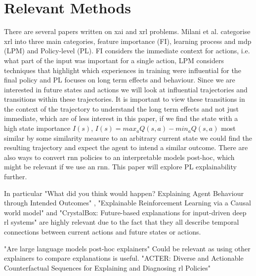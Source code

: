 \documentclass[UKenglish]{uiomasterthesis}
\begin{document}
\section{Relevant Methods}
There are several papers written on \ac{xai} and \ac{xrl} problems. Milani et al.\cite{milani2022survey} categorise \ac{xrl} into three main categories, feature importance (FI), learning process and \ac{mdp} (LPM) and Policy-level (PL). FI considers the immediate context for actions, i.e. what part of the input was important for a single action, LPM considers techniques that highlight which experiences in training were influential for the final policy and PL focuses on long term effects and behaviour. Since we are interested in future states and actions we will look at influential trajectories and transitions within these trajectories. It is important to view these transitions in the context of the trajectory to understand the long term effects and not just immediate, which are of less interest in this paper, if we find the state with a high state importance $I(s)$, $I(s) = max_aQ(s,a)-min_aQ(s,a)$ most similar by some similarity measure to an arbitrary current state we could find the resulting trajectory and expect the agent to intend a similar outcome. There are also ways to convert \ac{rnn} policies to an interpretable models post-hoc, which might be relevant if we use an \ac{rnn}. This paper will explore PL explainability further.

In particular "What did you think would happen? Explaining Agent Behaviour through Intended Outcomes" \cite{yau2020did}, "Explainable Reinforcement Learning via a Causal world model" \cite{yu2024explainable} and "CrystalBox: Future-based explanations for input-driven deep \ac{rl} systems" \cite{patel2024crystalbox} are highly relevant due to the fact that they all describe temporal connections between current actions and future states or actions.

"Are large language models post-hoc explainers" \cite{kroeger2024large} Could be relevant as using other explainers to compare explanations is useful. "ACTER: Diverse and Actionable Counterfactual Sequences for Explaining and Diagnosing \ac{rl} Policies" \cite{gajcin2024acter} 
\end{document}
